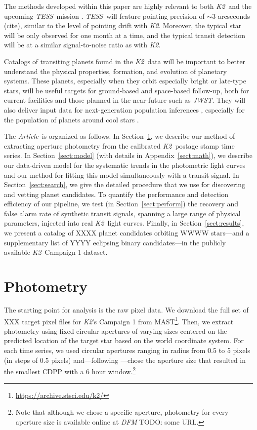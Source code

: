 \documentclass[12pt,preprint]{aastex}
\newcommand{\project}[1]{\textsl{#1}} %
\newcommand{\KT}{\project{K2}}
\newcommand{\tess}{\project{TESS}}
\newcommand{\jwst}{\project{JWST}}
\newcommand{\paper}{\textsl{Article}}
\newcommand{\Sect}[1]{Section~\ref{sect:#1}}
\newcommand{\sect}[1]{\Sect{#1}}
\newcommand{\App}[1]{Appendix~\ref{sect:#1}}
\newcommand{\app}[1]{\App{#1}}
\newcommand{\sectlabel}[1]{\label{sect:#1}}
\newcommand{\todo}[3]{{\color{#2} \emph{#1} TODO: #3}}
\newcommand{\dfmtodo}[1]{\todo{DFM}{red}{#1}}
\begin{document}
The methods developed within this paper are highly relevant to both \KT\ and
the upcoming \tess\ mission \citep{Ricker:2014}.
\tess\ will feature pointing precision of $\sim 3$ arcseconds (cite), similar
to the level of pointing drift with \KT.
Moreover, the typical star will be only observed for one month at a time, and
the typical transit detection will be at a similar signal-to-noise ratio as
with \KT.

Catalogs of transiting planets found in the \KT\ data will be important to
better understand the physical properties, formation, and evolution of
planetary systems.
These planets, especially when they orbit especially bright or late-type
stars, will be useful targets for ground-based and space-based follow-up, both
for current facilities and those planned in the near-future such as \jwst.
They will also deliver input data for next-generation population inferences
\citep{dfm}, especially for the population of planets around cool stars
\citep[for example][]{dressing}.

The \paper\ is organized as follows.
In \sect{phot}, we describe our method of extracting aperture photometry from
the calibrated \KT\ postage stamp time series.
In \sect{model} (with details in \app{math}), we describe our data-driven
model for the systematic trends in the photometric light curves and our method
for fitting this model simultaneously with a transit signal.
In \sect{search}, we give the detailed procedure that we use for discovering
and vetting planet candidates.
To quantify the performance and detection efficiency of our pipeline, we test
(in \sect{perform}) the recovery and false alarm rate of synthetic transit
signals, spanning a large range of physical parameters, injected into real
\KT\ light curves.
Finally, in \sect{results}, we present a catalog of XXXX planet candidates
orbiting WWWW stars---and a supplementary list of YYYY eclipsing binary
candidates---in the publicly available \KT\ Campaign 1 dataset.


\section{Photometry}
\sectlabel{phot}

The starting point for analysis is the raw pixel data.
We download the full set of XXX target pixel files for \KT's Campaign 1 from
MAST\footnote{\url{https://archive.stsci.edu/k2/}}.
Then, we extract photometry using fixed circular apertures of varying sizes
centered on the predicted location of the target star based on the world
coordinate system.
For each time series, we used circular apertures ranging in radius from 0.5 to
5 pixels (in steps of 0.5 pixels) and---following
\citet{Vanderburg:2014}---chose the aperture size that resulted in the
smallest CDPP \citep{cdpp}
with a 6 hour window.\footnote{Note that although we chose a specific
aperture, photometry for every aperture size is available online at
\dfmtodo{some URL}.}
\end{document}
